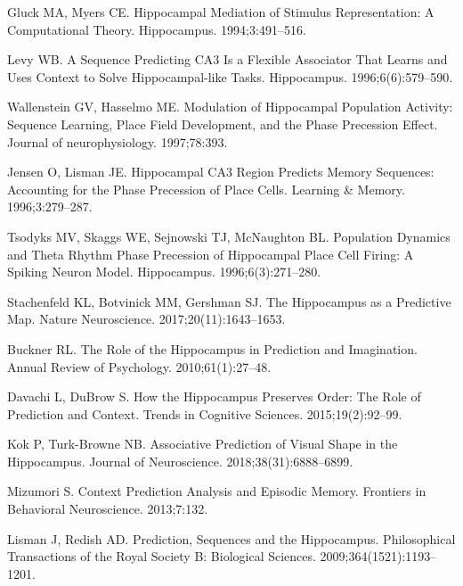 \documentclass[10pt,letterpaper]{article}
\begin{document}
\begin{thebibliography}{10}
  Gluck MA, Myers CE.
  \newblock Hippocampal Mediation of Stimulus Representation: A Computational
    Theory.
  \newblock Hippocampus. 1994;3:491--516.
  
  Levy WB.
  \newblock A Sequence Predicting {{CA3}} Is a Flexible Associator That Learns
    and Uses Context to Solve Hippocampal-like Tasks.
  \newblock Hippocampus. 1996;6(6):579--590.
  
  Wallenstein GV, Hasselmo ME.
   Modulation of Hippocampal Population Activity: Sequence
    Learning, Place Field Development, and the Phase Precession Effect.
  \newblock Journal of neurophysiology. 1997;78:393.
  
  Jensen O, Lisman JE.
  \newblock Hippocampal {{CA3}} Region Predicts Memory Sequences: {{Accounting}}
    for the Phase Precession of Place Cells.
  \newblock Learning \& Memory. 1996;3:279--287.
  
  Tsodyks MV, Skaggs WE, Sejnowski TJ, McNaughton BL.
  \newblock Population Dynamics and Theta Rhythm Phase Precession of Hippocampal
    Place Cell Firing: {{A}} Spiking Neuron Model.
  \newblock Hippocampus. 1996;6(3):271--280.
  
  Stachenfeld KL, Botvinick MM, Gershman SJ.
  \newblock The Hippocampus as a Predictive Map.
  \newblock Nature Neuroscience. 2017;20(11):1643--1653.
  
  Buckner RL.
  \newblock The {{Role}} of the {{Hippocampus}} in {{Prediction}} and
    {{Imagination}}.
  \newblock Annual Review of Psychology. 2010;61(1):27--48.
  
  Davachi L, DuBrow S.
  \newblock How the Hippocampus Preserves Order: The Role of Prediction and
    Context.
  \newblock Trends in Cognitive Sciences. 2015;19(2):92--99.
  
  Kok P, {Turk-Browne} NB.
  \newblock Associative Prediction of Visual Shape in the Hippocampus.
  \newblock Journal of Neuroscience. 2018;38(31):6888--6899.
  
  Mizumori S.
  \newblock Context {{Prediction Analysis}} and {{Episodic Memory}}.
  \newblock Frontiers in Behavioral Neuroscience. 2013;7:132.
  
  Lisman J, Redish AD.
  \newblock Prediction, Sequences and the Hippocampus.
  \newblock Philosophical Transactions of the Royal Society B: Biological
    Sciences. 2009;364(1521):1193--1201.
  

\end{thebibliography}
\end{document}
